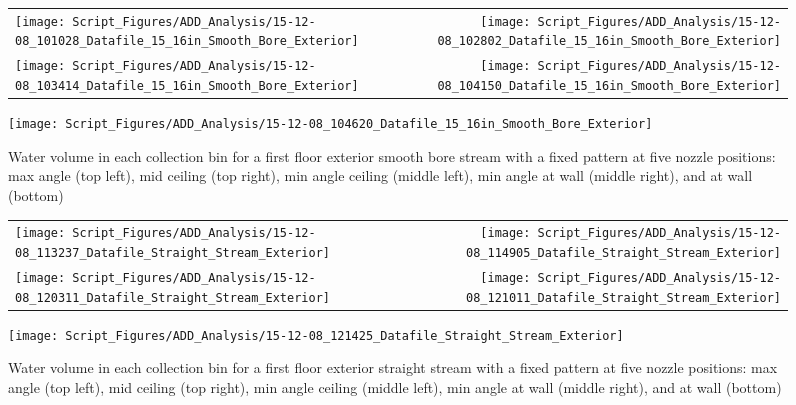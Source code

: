 \documentclass{article}
\begin{document}
\begin{figure}[ht]
\begin{tabular*}{\textwidth}{lr}
\texttt{[image: Script\_Figures/ADD\_Analysis/15-12-08\_101028\_Datafile\_15\_16in\_Smooth\_Bore\_Exterior]} &
\texttt{[image: Script\_Figures/ADD\_Analysis/15-12-08\_102802\_Datafile\_15\_16in\_Smooth\_Bore\_Exterior]} \\
\texttt{[image: Script\_Figures/ADD\_Analysis/15-12-08\_103414\_Datafile\_15\_16in\_Smooth\_Bore\_Exterior]} &
\texttt{[image: Script\_Figures/ADD\_Analysis/15-12-08\_104150\_Datafile\_15\_16in\_Smooth\_Bore\_Exterior]} \\
\end{tabular*}
\centering
\texttt{[image: Script\_Figures/ADD\_Analysis/15-12-08\_104620\_Datafile\_15\_16in\_Smooth\_Bore\_Exterior]} \\
\caption{Water volume in each collection bin for a first floor exterior smooth bore stream with a fixed pattern at five nozzle positions: max angle (top left), mid ceiling (top right), min angle ceiling (middle left), min angle at wall (middle right), and at wall (bottom)}
\label{fig:Exterior_First_Floor_Varying_Nozzle_Directions_SB_Fixed_Pattern}
\end{figure}

\begin{figure}[ht]
\begin{tabular*}{\textwidth}{lr}
\texttt{[image: Script\_Figures/ADD\_Analysis/15-12-08\_113237\_Datafile\_Straight\_Stream\_Exterior]} &
\texttt{[image: Script\_Figures/ADD\_Analysis/15-12-08\_114905\_Datafile\_Straight\_Stream\_Exterior]} \\
\texttt{[image: Script\_Figures/ADD\_Analysis/15-12-08\_120311\_Datafile\_Straight\_Stream\_Exterior]} &
\texttt{[image: Script\_Figures/ADD\_Analysis/15-12-08\_121011\_Datafile\_Straight\_Stream\_Exterior]} \\
\end{tabular*}
\centering
\texttt{[image: Script\_Figures/ADD\_Analysis/15-12-08\_121425\_Datafile\_Straight\_Stream\_Exterior]} \\
\caption{Water volume in each collection bin for a first floor exterior straight stream with a fixed pattern at five nozzle positions: max angle (top left), mid ceiling (top right), min angle ceiling (middle left), min angle at wall (middle right), and at wall (bottom)}
\label{fig:Exterior_First_Floor_Varying_Nozzle_Directions_SS_Fixed_Pattern}
\end{figure}
\end{document}
